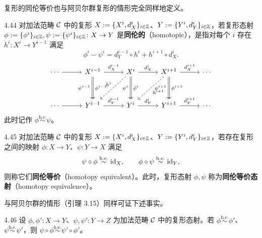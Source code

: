 复形的同伦等价也与阿贝尔群复形的情形完全同样地定义。

\begin{definition}{4.44}
对加法范畴 $\mathcal{C}$ 中的复形 $X:=\{X^i,d_X^i\}_{i\in\mathbb{Z}}$、$Y:=\{Y^i,d_Y^i\}_{i\in\mathbb{Z}}$，若复形态射 $\phi:=\{\phi^i\}_{i\in\mathbb{Z}},\psi:=\{\psi^i\}_{i\in\mathbb{Z}}\colon X\to Y$ 是\textbf{同伦的}（homotopic），是指对每个 $i$ 存在 $h^i\colon X^i\to Y^{i-1}$ 满足
\[ \phi^i-\psi^i=d_Y^{i-1}\circ h^i+h^{i+1}\circ d_X^i. \]
\[\begin{tikzcd}[row sep=3.2em, column sep=2.8em]
  \cdots \arrow[r] & X^{i-1} \arrow[r,"d_X^{i-1}"] \arrow[d,shift left=1pt,"\phi^{i-1}"] \arrow[d,shift right=1pt,"\psi^{i-1}"'] & X^i \arrow[r,"d_X^i"] \arrow[d,shift left=1pt,"\phi^i"] \arrow[d,shift right=1pt,"\psi^i"'] \arrow[dl,dashed,"h^i"'] & X^{i+1} \arrow[r,"d_X^{i+1}"] \arrow[d,shift left=1pt,"\phi^{i+1}"] \arrow[d,shift right=1pt,"\psi^{i+1}"'] \arrow[dl,dashed,"h^{i+1}"] & \cdots \\
  \cdots \arrow[r] & Y^{i-1} \arrow[r,"d_Y^{i-1}"] & Y^i \arrow[r,"d_Y^i"] & Y^{i+1} \arrow[r,"d_Y^{i+1}"] & \cdots
\end{tikzcd}\]
此时记作 $\phi\overset{\mathrm{h.e.}}{\sim}\psi$。
\end{definition}

\begin{definition}{4.45}
对加法范畴 $\mathcal{C}$ 中的复形 $X:=\{X^i,d_X^i\}_{i\in\mathbb{Z}}$、$Y:=\{Y^i,d_Y^i\}_{i\in\mathbb{Z}}$，若存在复形之间的映射 $\phi\colon X\to Y$、$\psi\colon Y\to X$ 满足
\[ \psi\circ\phi\overset{\mathrm{h.e.}}{\sim}\mathrm{id}_X,\qquad \phi\circ\psi\overset{\mathrm{h.e.}}{\sim}\mathrm{id}_Y, \]
则称它们\textbf{同伦等价}（homotopy equivalent）。此时，复形态射 $\phi,\psi$ 称为\textbf{同伦等价态射}（homotopy equivalence）。
\end{definition}

与阿贝尔群的情形（引理 3.15）同样可证下述事实。

\begin{lemma}{4.46}
设 $\phi,\phi'\colon X\to Y$、$\psi,\psi'\colon Y\to Z$ 为加法范畴 $\mathcal{C}$ 中的复形态射。若 $\phi\overset{\mathrm{h.e.}}{\sim}\phi'$、$\psi\overset{\mathrm{h.e.}}{\sim}\psi'$，则 $\psi\circ\phi\overset{\mathrm{h.e.}}{\sim}\psi'\circ\phi'$。
\end{lemma}

